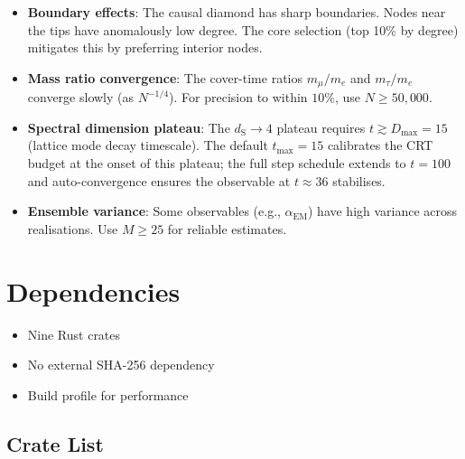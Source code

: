 \documentclass[11pt, a4paper, openany]{book}
\newcommand{\dS}{d_{\mathrm{S}}}
\newenvironment{introduction}[1][Chapter Overview]{%
  \begin{tcolorbox}[
    enhanced,colback=structure!5,colframe=structure,
    colbacktitle=structure,coltitle=white,
    fonttitle=\small\bfseries,title={#1},
    arc=2pt,boxrule=0.7pt,
    left=8pt,right=8pt,top=6pt,bottom=6pt,
    before skip=12pt,after skip=12pt
  ]\itshape\begin{itemize}[leftmargin=*,itemsep=2pt,parsep=0pt]
}{%
  \end{itemize}\end{tcolorbox}
}
\begin{document}
\begin{itemize}
  \item \textbf{Boundary effects}: The causal diamond has sharp boundaries.
        Nodes near the tips have anomalously low degree.  The core selection
        (top 10\% by degree) mitigates this by preferring interior nodes.
  \item \textbf{Mass ratio convergence}: The cover-time ratios $m_\mu/m_e$ and
        $m_\tau/m_e$ converge slowly (as $N^{-1/4}$).  For precision to within
        $10\%$, use $N \geq 50{,}000$.
  \item \textbf{Spectral dimension plateau}: The $\dS \to 4$ plateau requires
        $t \gtrsim D_{\max} = 15$ (lattice mode decay timescale).  The default
        $t_{\max} = 15$ calibrates the CRT budget at the onset of this plateau;
        the full step schedule extends to $t = 100$ and auto-convergence ensures
        the observable at $t \approx 36$ stabilises.
  \item \textbf{Ensemble variance}: Some observables (e.g., $\alpha_{\text{EM}}$)
        have high variance across realisations.  Use $M \geq 25$ for reliable
        estimates.
\end{itemize}


\chapter{Dependencies}

\begin{introduction}
  \item Nine Rust crates
  \item No external SHA-256 dependency
  \item Build profile for performance
\end{introduction}

\section{Crate List}
\end{document}
